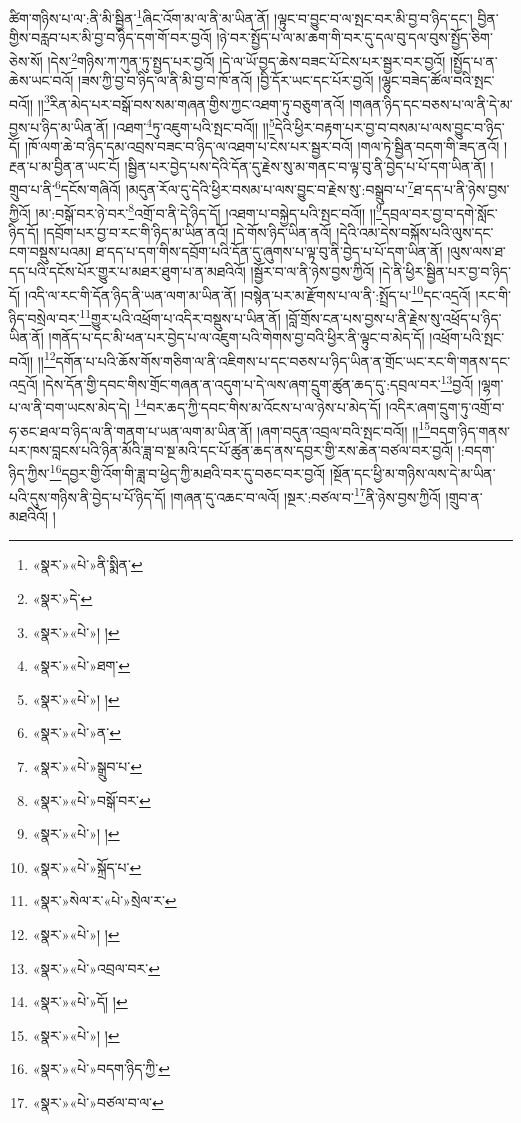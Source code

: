 ཚིག་གཉིས་པ་ལ་:ནི་མི་སྦྱིན་\footnote{«སྣར་»«པེ་»ནི་སྨིན་}ཞིང་འོག་མ་ལ་ནི་མ་ཡིན་ནོ། །ལྟུང་བ་བྱུང་བ་ལ་སྤང་བར་མི་བྱ་བ་ཉིད་དང་། བྱིན་གྱིས་བརླབ་པར་མི་བྱ་བ་ཉིད་དག་གོ་བར་བྱའོ། །ཉེ་བར་སྤྱོད་པ་ལ་མ་ཆག་གི་བར་དུ་དལ་བུ་དལ་བུས་སྤྱོད་ཅིག་ཅེས་སོ། །དེས་\footnote{«སྣར་»དེ་}གཉིས་ཀ་ཀུན་ཏུ་སྤྱད་པར་བྱའོ། །དེ་ལ་ཡོ་བྱད་ཆེས་བཟང་པོ་ངེས་པར་སྦྱར་བར་བྱའོ། །སྤྱོད་པ་ན་ཆེས་ཡང་བའོ། །ཟས་ཀྱི་བྱ་བ་ཉིད་ལ་ནི་མི་བྱ་བ་ཁོ་ནའོ། །བྱི་དོར་ཡང་དང་པོར་བྱའོ། །ལྷུང་བཟེད་ཚོལ་བའི་སྤང་བའོ།། །།\footnote{«སྣར་»«པེ་»། །}རིན་མེད་པར་བསྒོ་བས་སམ་གཞན་གྱིས་ཀྱང་འཐག་ཏུ་བཅུག་ནའོ། །གཞན་ཉིད་དང་བཅས་པ་ལ་ནི་དེ་མ་བྱས་པ་ཉིད་མ་ཡིན་ནོ། །འཐག་\footnote{«སྣར་»«པེ་»ཐག་}ཏུ་འཇུག་པའི་སྤང་བའོ།། །།\footnote{«སྣར་»«པེ་»། །}དེའི་ཕྱིར་བརྟག་པར་བྱ་བ་བསམ་པ་ལས་བྱུང་བ་ཉིད་དོ། །ཁོ་ལག་ཆེ་བ་ཉིད་དམ་འབྲས་བཟང་བ་ཉིད་ལ་འཐག་པ་ངེས་པར་སྦྱར་བའོ། །གལ་ཏེ་སྦྱིན་བདག་གི་ཟད་ནའོ། །རྔན་པ་མ་བྱིན་ན་ཡང་ངོ། །སྦྱིན་པར་བྱེད་པས་དེའི་དོན་དུ་རྗེས་སུ་མ་གནང་བ་ལྟ་བུ་ནི་བྱེད་པ་པོ་དག་ཡིན་ནོ། །གྲུབ་པ་ནི་\footnote{«སྣར་»«པེ་»ན་}དངོས་གཞིའོ། །མདུན་རོལ་དུ་དེའི་ཕྱིར་བསམ་པ་ལས་བྱུང་བ་རྗེས་སུ་:བསྒྲུབ་པ་\footnote{«སྣར་»«པེ་»སྒྲུབ་པ་}ཐ་དད་པ་ནི་ཉེས་བྱས་ཀྱིའོ། །མ་:བསྒོ་བར་ཉེ་བར་\footnote{«སྣར་»«པེ་»བསྒོ་བར་}འགྲོ་བ་ནི་དེ་ཉིད་དོ། །འཐག་པ་བསྐྱེད་པའི་སྤང་བའོ།། །།\footnote{«སྣར་»«པེ་»། །}དབྲལ་བར་བྱ་བ་དགེ་སློང་ཉིད་དོ། །དབྲོག་པར་བྱ་བ་རང་གི་ཉིད་མ་ཡིན་ནའོ། །དེ་གོས་ཉིད་ཡིན་ནའོ། །དེའི་འམ་དེས་བསྐོས་པའི་ལུས་དང་ངག་བསྡུས་པའམ། ཐ་དད་པ་དག་གིས་དབྲོག་པའི་དོན་དུ་ཞུགས་པ་ལྟ་བུ་ནི་བྱེད་པ་པོ་དག་ཡིན་ནོ། །ལུས་ལས་ཐ་དད་པའི་དངོས་པོར་གྱུར་པ་མཐར་ཐུག་པ་ན་མཐའིའོ། །སྦྱོར་བ་ལ་ནི་ཉེས་བྱས་ཀྱིའོ། །དེ་ནི་ཕྱིར་སྦྱིན་པར་བྱ་བ་ཉིད་དོ། །འདི་ལ་རང་གི་དོན་ཉིད་ནི་ཡན་ལག་མ་ཡིན་ནོ། །བསྙེན་པར་མ་རྫོགས་པ་ལ་ནི་:སྤྲོད་པ་\footnote{«སྣར་»«པེ་»སྐྲོད་པ་}དང་འདྲའོ། །རང་གི་ཉིད་བསྲེལ་བར་\footnote{«སྣར་»སེལ་ར་«པེ་»སྲེལ་ར་}གྱུར་པའི་འཕྲོག་པ་འདིར་བསྡུས་པ་ཡིན་ནོ། །བློ་གྲོས་ངན་པས་བྱས་པ་ནི་རྗེས་སུ་འཕྲོད་པ་ཉིད་ཡིན་ནོ། །གནོད་པ་དང་མི་ཕན་པར་བྱེད་པ་ལ་འཇུག་པའི་གེགས་བྱ་བའི་ཕྱིར་ནི་ལྟུང་བ་མེད་དོ། །འཕྲོག་པའི་སྤང་བའོ།། །།\footnote{«སྣར་»«པེ་»། །}དགོན་པ་པའི་ཆོས་གོས་གཅིག་ལ་ནི་འཇིགས་པ་དང་བཅས་པ་ཉིད་ཡིན་ན་གྲོང་ཡང་རང་གི་གནས་དང་འདྲའོ། །དེས་དོན་གྱི་དབང་གིས་གྲོང་གཞན་ན་འདུག་པ་དེ་ལས་ཞག་དྲུག་ཚུན་ཆད་དུ་:དབྲལ་བར་\footnote{«སྣར་»«པེ་»འབྲལ་བར་}བྱའོ། །ལྷག་པ་ལ་ནི་བག་ཡངས་མེད་དེ། \footnote{«སྣར་»«པེ་»དོ། ། }བར་ཆད་ཀྱི་དབང་གིས་མ་འོངས་པ་ལ་ཉེས་པ་མེད་དོ། །འདིར་ཞག་དྲུག་ཏུ་འགྲོ་བ་ཧ་ཅང་ཐལ་བ་ཉིད་ལ་ནི་གནག་པ་ཡན་ལག་མ་ཡིན་ནོ། །ཞག་བདུན་འབྲལ་བའི་སྤང་བའོ།། །།\footnote{«སྣར་»«པེ་»། །}བདག་ཉིད་གནས་པར་ཁས་བླངས་པའི་ཉིན་མོའི་ཟླ་བ་སྔ་མའི་དང་པོ་ཚུན་ཆད་ནས་དབྱར་གྱི་རས་ཆེན་བཙལ་བར་བྱའོ། །:བདག་ཉིད་ཀྱིས་\footnote{«སྣར་»«པེ་»བདག་ཉིད་ཀྱི་}དབྱར་གྱི་འོག་གི་ཟླ་བ་ཕྱེད་ཀྱི་མཐའི་བར་དུ་བཅང་བར་བྱའོ། །སྔོན་དང་ཕྱི་མ་གཉིས་ལས་དེ་མ་ཡིན་པའི་དུས་གཉིས་ནི་བྱེད་པ་པོ་ཉིད་དོ། །གཞན་དུ་འཆང་བ་ལའོ། །སྔར་:བཙལ་བ་\footnote{«སྣར་»«པེ་»བཙལ་བ་ལ་}ནི་ཉེས་བྱས་ཀྱིའོ། །གྲུབ་ན་མཐའིའོ། །
